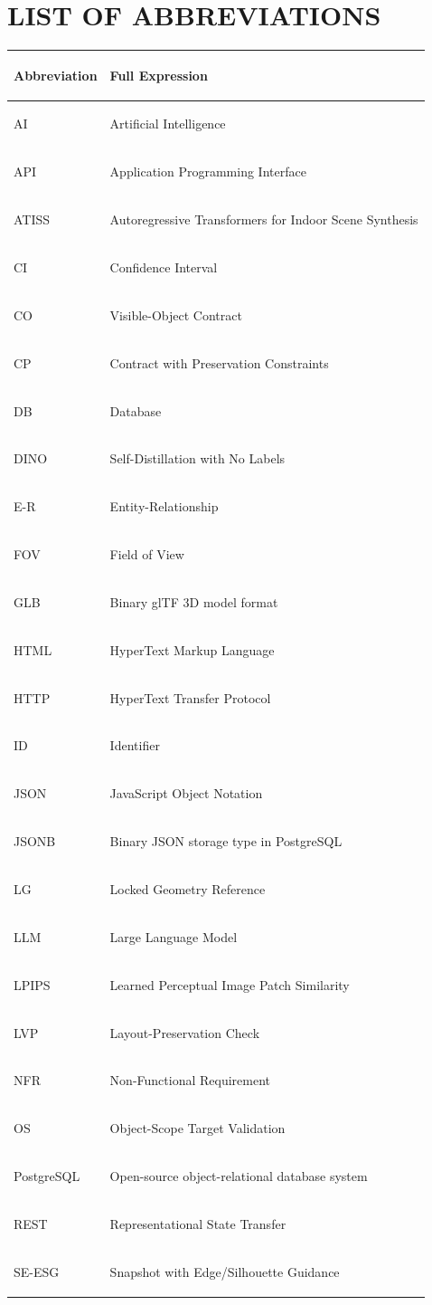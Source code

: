 \chapter*{LIST OF ABBREVIATIONS}
\begin{xltabular}{\textwidth}{|>{\bfseries\raggedright\arraybackslash}p{0.22\textwidth}|>{\raggedright\arraybackslash}X|}
\hline
\textbf{Abbreviation} & \textbf{Full Expression} \\
\hline
AI & Artificial Intelligence \\
\hline
API & Application Programming Interface \\
\hline
ATISS & Autoregressive Transformers for Indoor Scene Synthesis \\
\hline
CI & Confidence Interval \\
\hline
CO & Visible-Object Contract \\
\hline
CP & Contract with Preservation Constraints \\
\hline
DB & Database \\
\hline
DINO & Self-Distillation with No Labels \\
\hline
E-R & Entity-Relationship \\
\hline
FOV & Field of View \\
\hline
GLB & Binary glTF 3D model format \\
\hline
HTML & HyperText Markup Language \\
\hline
HTTP & HyperText Transfer Protocol \\
\hline
ID & Identifier \\
\hline
JSON & JavaScript Object Notation \\
\hline
JSONB & Binary JSON storage type in PostgreSQL \\
\hline
LG & Locked Geometry Reference \\
\hline
LLM & Large Language Model \\
\hline
LPIPS & Learned Perceptual Image Patch Similarity \\
\hline
LVP & Layout-Preservation Check \\
\hline
NFR & Non-Functional Requirement \\
\hline
OS & Object-Scope Target Validation \\
\hline
PostgreSQL & Open-source object-relational database system \\
\hline
REST & Representational State Transfer \\
\hline
SE-ESG & Snapshot with Edge/Silhouette Guidance \\

\end{xltabular}
